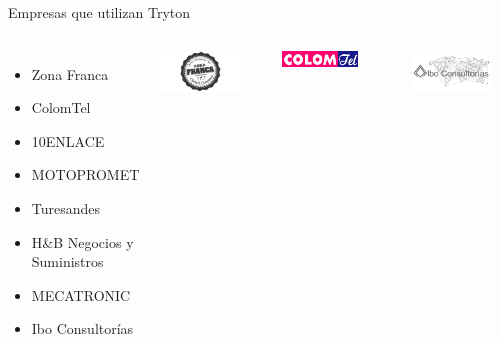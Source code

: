 	\begin{frame}{Empresas que utilizan Tryton}
	\fontsize{10}{11}\selectfont
        \begin{columns}
			\begin{itemize}
				\item Zona Franca
				\item ColomTel
				\item 10ENLACE
				\item MOTOPROMET
				\item Turesandes
				\item H\&B Negocios y Suministros
				\item MECATRONIC
				\item Ibo Consultorías
			\end{itemize}
            \vspace*{-0.6cm}
            \begin{center}
            \includegraphics[width=0.8\textwidth]{./Images/ZonaFranca.jpg}
            \end{center}
            \vspace*{-0.5cm}
            \begin{center}
            \includegraphics[width=0.7\textwidth]{./Images/ColomTel.png}
            \end{center}
            \vspace*{-0.5cm}
            \begin{center}
            \includegraphics[width=0.8\textwidth]{./Images/IboConsultorias.png}
            \end{center}
        \end{columns}
	\end{frame}

